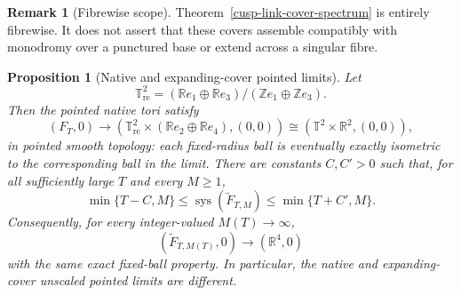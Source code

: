 \documentclass[11pt]{article}
\newtheorem{proposition}[theorem]{Proposition}
\theoremstyle{definition}
\newtheorem{remark}[theorem]{Remark}
\numberwithin{equation}{section}
\begin{document}
\begin{remark}[Fibrewise scope]
Theorem~\ref{cusp-link-cover-spectrum} is entirely fibrewise.  It does not
assert that these covers assemble compatibly with monodromy over a punctured
base or extend across a singular fibre.
\end{remark}

\begin{proposition}[Native and expanding-cover pointed limits]
\label{cusp-link-pointed-limits}
Let
\[
 \mathbb T^2_{\mathrm{re}}
 = (\mathbb Re_1\oplus\mathbb Re_3)/
   (\mathbb Ze_1\oplus\mathbb Ze_3).
\]
Then the pointed native tori satisfy
\begin{equation}
 (F_T,0)\longrightarrow
 (\mathbb T^2_{\mathrm{re}}\times
   (\mathbb Re_2\oplus\mathbb Re_4),(0,0))
 \cong(\mathbb T^2\times\mathbb R^2,(0,0)),
 \label{cusp-link-native-pointed-limit}
\end{equation}
in pointed smooth topology: each fixed-radius ball is eventually exactly
isometric to the corresponding ball in the limit.  There are constants
\(C,C'>0\) such that, for all sufficiently large \(T\) and every
\(M\ge1\),
\begin{equation}
 \min\{T-C,M\}
 \le\operatorname{sys}(\widetilde F_{T,M})
 \le\min\{T+C',M\}.
 \label{cusp-link-cover-systole-two-sided}
\end{equation}
Consequently, for every integer-valued \(M(T)\to\infty\),
\begin{equation}
 (\widetilde F_{T,M(T)},0)\longrightarrow(\mathbb R^4,0)
 \label{cusp-link-cover-pointed-limit}
\end{equation}
with the same exact fixed-ball property.  In particular, the native and
expanding-cover unscaled pointed limits are different.
\end{proposition}
\end{document}
